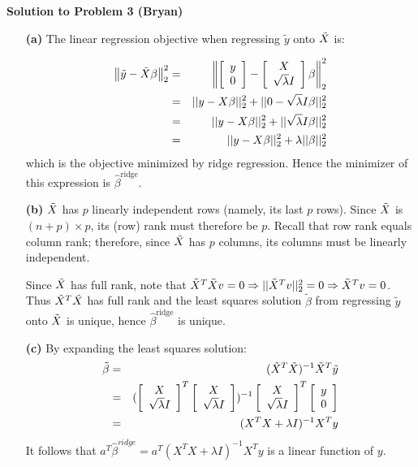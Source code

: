 \documentclass[11pt]{article}
\begin{document}
\begin{framed}
{\bf\large Solution to Problem 3 (Bryan)}
\begin{enumerate}
\item[{\bf (a)}]
The linear regression objective when regressing $\tilde{{y}}$
onto $\tilde{{ X}}$ is: 

\begin{eqnarray*}
\left\| \tilde{{ y}}-\tilde{{ X}}\beta \right\|_{2}^{2} & = & \left\| \left[\begin{array}{c}
y\\
0
\end{array}\right]-\left[\begin{array}{c}
X\\
\sqrt{\lambda}I
\end{array}\right]\beta \right\|_{2}^{2}\\
 & = & ||y-X\beta||_{2}^{2}+||0-\sqrt{\lambda}I\beta||_{2}^{2}\\
 & = & ||y-X\beta||_{2}^{2}+||\sqrt{\lambda}I\beta||_{2}^{2}\\
 & = & ||y-X\beta||_{2}^{2}+\lambda||\beta||_{2}^{2}
\end{eqnarray*}
which is the objective minimized by ridge regression. Hence the minimizer
of this expression is $\hat{{\beta}}^{\mbox{ridge}}$.

\item[{\bf (b)}] $\tilde{{ X}}$ has $p$ linearly independent rows (namely, its last $p$
rows). Since $\tilde{{ X}}$ is $(n+p)\times p$, its (row) rank must therefore be $p$.
Recall that row rank equals column rank; therefore, since $\tilde{{ X}}$ has $p$
columns, its columns must be linearly independent.


Since $\tilde{{ X}}$ has full rank, note that
$\tilde{{ X}}^{T}\tilde{{ X}} v=0\Rightarrow||\tilde{{ X}}^{T}v||_{2}^{2}=0\Rightarrow\tilde{{ X}}^{T}v=0$.
Thus $\tilde{{ X}}^{T}\tilde{{ X}}$ has full rank and the least squares solution $\tilde{\beta}$
from regressing $\tilde{{y}}$ onto $\tilde{{ X}}$ is unique, hence
$\hat{{\beta}}^{\mbox{ridge}}$ is unique.

\item[{\bf (c)}] By expanding the least squares solution:
\begin{eqnarray*}
\tilde{\beta} & = & (\tilde{{ X}}^{T}\tilde{{ X}})^{-1}\tilde{{ X}}^{T}\tilde{{ y}}\\
 & = & (\left[\begin{array}{c}
X\\
\sqrt{\lambda}I
\end{array}\right]^{T}\left[\begin{array}{c}
X\\
\sqrt{\lambda}I
\end{array}\right])^{-1}\left[\begin{array}{c}
X\\
\sqrt{\lambda}I
\end{array}\right]^{T}\left[\begin{array}{c}
y\\
0
\end{array}\right]\\
 & = & (X^{T}X+\lambda I)^{-1}X^{T}y
\end{eqnarray*}
It follows that $a^{T}\hat{{\beta}}^{ridge}=a^{T}(X^{T}X+\lambda I)^{-1}X^{T}y$
is a linear function of $y$.


\end{enumerate}
\end{framed}
\end{document}
